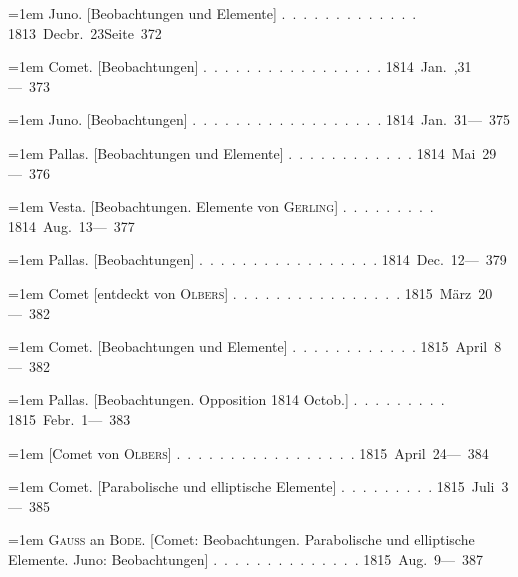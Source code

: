 \clearpage
{}
\begingroup
\raggedright
\noindent\hangindent=1em Juno. [Beobachtungen und Elemente] \mbox{.\ .\ .\ .\ .\ .\ .\ .\ .\ .\ .\ .\ .} \hfill\mbox{1813 Decbr. 23}\quad\mbox{Seite 372}\par\smallskip
\noindent\hangindent=1em Comet. [Beobachtungen] \mbox{.\ .\ .\ .\ .\ .\ .\ .\ .\ .\ .\ .\ .\ .\ .\ .\ .} \hfill\mbox{1814 Jan. ,31}\quad\mbox{--- 373}\par\smallskip
\noindent\hangindent=1em Juno. [Beobachtungen] \mbox{.\ .\ .\ .\ .\ .\ .\ .\ .\ .\ .\ .\ .\ .\ .\ .\ .\ .} \hfill\mbox{1814 Jan. 31}\quad\mbox{--- 375}\par\smallskip
\noindent\hangindent=1em Pallas. [Beobachtungen und Elemente] \mbox{.\ .\ .\ .\ .\ .\ .\ .\ .\ .\ .\ .} \hfill\mbox{1814 Mai 29}\quad\mbox{--- 376}\par\smallskip
\noindent\hangindent=1em Vesta. [Beobachtungen. Elemente von \textsc{Gerling}] \mbox{.\ .\ .\ .\ .\ .\ .\ .\ .} \hfill\mbox{1814 Aug. 13}\quad\mbox{--- 377}\par\smallskip
\noindent\hangindent=1em Pallas. [Beobachtungen] \mbox{.\ .\ .\ .\ .\ .\ .\ .\ .\ .\ .\ .\ .\ .\ .\ .\ .} \hfill\mbox{1814 Dec. 12}\quad\mbox{--- 379}\par\smallskip
\noindent\hangindent=1em Comet [entdeckt von \textsc{Olbers}] \mbox{.\ .\ .\ .\ .\ .\ .\ .\ .\ .\ .\ .\ .\ .\ .\ .} \hfill\mbox{1815 März 20}\quad\mbox{--- 382}\par\smallskip
\noindent\hangindent=1em Comet. [Beobachtungen und Elemente] \mbox{.\ .\ .\ .\ .\ .\ .\ .\ .\ .\ .\ .} \hfill\mbox{1815 April 8}\quad\mbox{--- 382}\par\smallskip
\noindent\hangindent=1em Pallas. [Beobachtungen. Opposition 1814 Octob.] \mbox{.\ .\ .\ .\ .\ .\ .\ .\ .} \hfill\mbox{1815 Febr. 1}\quad\mbox{--- 383}\par\smallskip
\noindent\hangindent=1em \hspace{1em}[Comet von \textsc{Olbers}] \mbox{.\ .\ .\ .\ .\ .\ .\ .\ .\ .\ .\ .\ .\ .\ .\ .\ .} \hfill\mbox{1815 April 24}\quad\mbox{--- 384}\par\smallskip
\noindent\hangindent=1em Comet. [Parabolische und elliptische Elemente] \mbox{.\ .\ .\ .\ .\ .\ .\ .\ .} \hfill\mbox{1815 Juli 3}\quad\mbox{--- 385}\par\smallskip
\noindent\hangindent=1em \textsc{Gauss} an \textsc{Bode}. [Comet: Beobachtungen. Parabolische und elliptische Elemente. Juno: Beobachtungen] \mbox{.\ .\ .\ .\ .\ .\ .\ .\ .\ .\ .\ .\ .\ .} \hfill\mbox{1815 Aug. 9}\quad\mbox{--- 387}\par\smallskip
